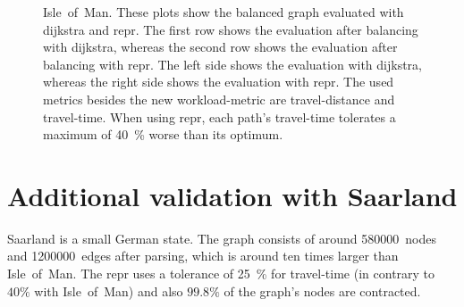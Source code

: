         \begin{figure}[hbp]
            \centering%
            \hfill%

            \hfill%
            \caption[Workloads on the balanced graph of Isle~of~Man]{%
                Isle~of~Man.
                These plots show the balanced graph evaluated with \gls{dijkstra} and \gls{repr}.
                The first row shows the evaluation after \gls{balancing} with \gls{dijkstra}, whereas the second row shows the evaluation after \gls{balancing} with \gls{repr}.
                The left side shows the evaluation with \gls{dijkstra}, whereas the right side shows the evaluation with \gls{repr}.
                The used \glspl{metric} besides the new workload-\gls{metric} are travel-distance and travel-time.
                When using \gls{repr}, each path's travel-time tolerates a maximum of \si{\num{40} \percent} worse than its optimum.
                \label{fig:isle_of_man/both/both/1/workloads}
            }
        \end{figure}

    \section{Additional validation with Saarland}

        Saarland is a small German state.
        The graph consists of around \num{580000}~nodes and \num{1200000}~edges after parsing, which is around ten times larger than Isle~of~Man.
        The \gls{repr} uses a tolerance of \si{25 \percent} for travel-time (in contrary to $\si{40 \percent}$ with Isle~of~Man) and also $\si{\num{99.8} \percent}$ of the graph's nodes are contracted.


